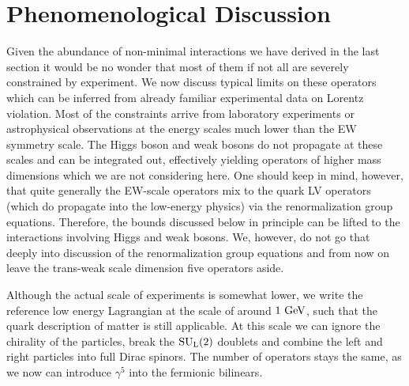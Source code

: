 \documentclass[12pt]{revtex4}
\newcommand{\sul}{{\rm SU}_{\rm L}(2)}
\newcommand{\GeV}{{\rm GeV}}
\begin{document}
%
%
\section{Phenomenological Discussion}
	
	Given the abundance of non-minimal interactions we have derived in 
	the last section it would be no wonder that most of them if not all
	are severely constrained by experiment.
	We now discuss typical limits on these operators 
	which can be inferred from already familiar experimental data
	on Lorentz violation.
	Most of the constraints arrive from laboratory experiments
	or astrophysical observations at the energy scales much lower
	than the EW symmetry scale. 
	The Higgs boson and weak bosons do not propagate 
	at these scales and can be integrated out, effectively yielding operators of 
	higher mass dimensions which we are not considering here.
	One should keep in mind, however, that quite generally the EW-scale operators 
	mix to the quark LV operators (which do propagate into the low-energy
	physics) via the renormalization group equations. 
	Therefore, the bounds discussed below in principle can be lifted to the 
	interactions involving Higgs and weak bosons. 
	We, however, do not go that deeply into discussion of the renormalization
	group equations and from now on leave the trans-weak scale dimension five 
	operators aside.
	

	Although the actual scale of experiments is somewhat lower,
	we write the reference low energy Lagrangian at the scale of
	around $ 1~\GeV $, such that the quark description of matter is 
	still applicable.
	At this scale we can ignore the chirality of the particles, break the
	$ \sul $ doublets and combine the left and right particles into
	full Dirac spinors. 
	The number of operators stays the same, as we now can introduce
	$ \gamma^5 $ into the fermionic bilinears. 
\end{document}
